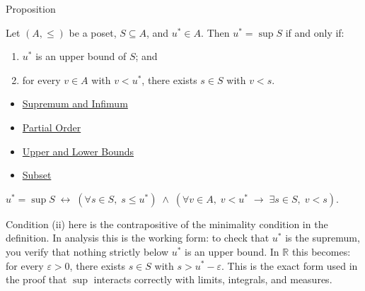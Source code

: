 
\begin{propositionbox}{Proposition}
\begin{proposition}
\label{prop:sup-char}
Let $(A, \leq)$ be a poset, $S \subseteq A$, and $u^* \in A$.  Then
$u^* = \sup S$ if and only if:
\begin{enumerate}[label=(\roman*)]
  \item $u^*$ is an upper bound of $S$; and
  \item for every $v \in A$ with $v < u^*$, there exists $s \in S$ with
        $v < s$.
\end{enumerate}
\end{proposition}
\end{propositionbox}

\begin{dependencies}
\begin{itemize}
  \item \hyperref[def:sup-inf]{Supremum and Infimum}
  \item \hyperref[def:partial-order]{Partial Order}
  \item \hyperref[def:bounds]{Upper and Lower Bounds}
  \item \hyperref[def:subset]{Subset}
\end{itemize}
\end{dependencies}

\begin{remark*}
$u^* = \sup S \;\leftrightarrow\; (\forall s \in S,\; s \leq u^*) \;\wedge\;
(\forall v \in A,\; v < u^* \;\rightarrow\; \exists s \in S,\; v < s)$.
\end{remark*}

\begin{remark*}
\label{rem:sup-char-utility}
Condition (ii) here is the contrapositive of the minimality condition in
the definition.  In analysis this is the working form: to check that
$u^*$ is the supremum, you verify that nothing strictly below $u^*$ is an
upper bound.  In $\mathbb{R}$ this becomes: for every $\varepsilon > 0$,
there exists $s \in S$ with $s > u^* - \varepsilon$.  This is the exact
form used in the proof that $\sup$ interacts correctly with limits,
integrals, and measures.
\end{remark*}

